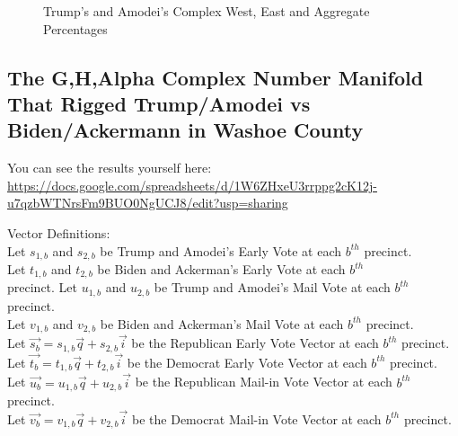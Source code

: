 \begin{figure}[bp!]
\begin{center}
\caption{Trump's and Amodei's Complex West, East and Aggregate Percentages}
\noindent{}
\end{center}
\end{figure}
\newpage
\subsection{The G,H,Alpha Complex Number Manifold That Rigged Trump/Amodei vs Biden/Ackermann in Washoe County}

You can see the results yourself here: \url{https://docs.google.com/spreadsheets/d/1W6ZHxeU3rrppg2cK12j-u7qzbWTNrsFm9BUO0NgUCJ8/edit?usp=sharing}

Vector Definitions:\\
Let $s_{1,b}$ and $s_{2,b}$ be Trump and Amodei's Early Vote at each $b^{th}$ precinct.\\
Let $t_{1,b}$ and $t_{2,b}$ be Biden and Ackerman's Early Vote at each $b^{th}$\\ precinct.
Let $u_{1,b}$ and $u_{2,b}$ be Trump and Amodei's Mail Vote at each $b^{th}$ precinct.\\
Let $v_{1,b}$ and $v_{2,b}$ be Biden and Ackerman's Mail Vote at each $b^{th}$ precinct.\\
Let $\vec{s_{b}}=s_{1,b}\vec{q}+s_{2,b}\vec{i}$ be the Republican Early Vote Vector at each $b^{th}$ precinct.\\
Let $\vec{t_{b}}=t_{1,b}\vec{q}+t_{2,b}\vec{i}$ be the Democrat Early Vote Vector at each $b^{th}$ precinct.\\
Let $\vec{u_{b}}=u_{1,b}\vec{q}+u_{2,b}\vec{i}$ be the Republican Mail-in Vote Vector at each $b^{th}$ precinct.\\
Let $\vec{v_{b}}=v_{1,b}\vec{q}+v_{2,b}\vec{i}$ be the Democrat Mail-in Vote Vector at each $b^{th}$ precinct.

